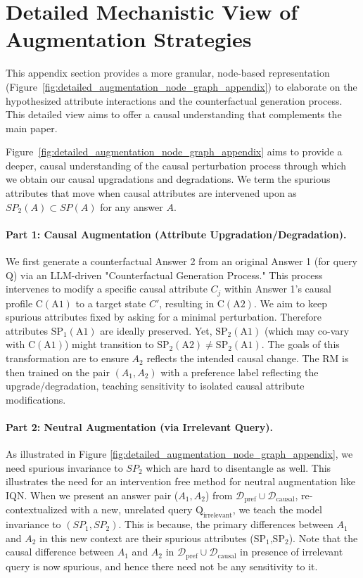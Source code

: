 \section{Detailed Mechanistic View of Augmentation Strategies}
\label{app:detailed_augmentation_diagrams}

This appendix section provides a more granular, node-based representation (Figure~\ref{fig:detailed_augmentation_node_graph_appendix}) to elaborate on the hypothesized attribute interactions and the counterfactual generation process. This detailed view aims to offer a causal understanding that complements the main paper.

Figure~\ref{fig:detailed_augmentation_node_graph_appendix} aims to provide a deeper, causal understanding of the causal perturbation process through which we obtain our causal upgradations and degradations. We term the spurious attributes that move when causal attributes are intervened upon as $SP_2(A) \subset SP(A)$ for any answer $A$.

\paragraph{Part 1: Causal Augmentation (Attribute Upgradation/Degradation).}
We first generate a counterfactual Answer 2 from an original Answer 1 (for query $\mathrm{Q}$) via an LLM-driven "Counterfactual Generation Process." This process intervenes to modify a specific causal attribute $C_j$ within Answer 1's causal profile $\mathrm{C(A1)}$ to a target state $C'$, resulting in $\mathrm{C(A2)}$. 
We aim to keep spurious attributes fixed by asking for a minimal perturbation. Therefore attributes $\mathrm{SP_1(A1)}$ are ideally preserved.
Yet, $\mathrm{SP_2(A1)}$ (which may co-vary with $\mathrm{C(A1)}$) might transition to $\mathrm{SP_2(A2)}\neq\mathrm{SP_2(A1)}$. The goals of this transformation are to ensure $A_2$ reflects the intended causal change. The RM is then trained on the pair $(A_1, A_2)$ with a preference label reflecting the upgrade/degradation, teaching sensitivity to isolated causal attribute modifications. 

\paragraph{Part 2: Neutral Augmentation (via Irrelevant Query).}
As illustrated in Figure \ref{fig:detailed_augmentation_node_graph_appendix}, we need spurious invariance to $SP_2$ which are hard to disentangle as well. This illustrates the need for an intervention free method for neutral augmentation like IQN. When we present an answer pair ($A_1, A_2$) from $\mathcal{D}_{\mathrm{pref}} \cup \mathcal{D}_{\mathrm{causal}}$,
re-contextualized with a new, unrelated query $\mathrm{Q}_{\text{irrelevant}}$,
we teach the model invariance to $(SP_1, SP_2)$.
This is because, the primary differences between $A_1$ and $A_2$ in this new context are their spurious attributes ($\mathrm{SP_1}$,$\mathrm{SP_2}$). 
Note that the causal difference between $A_1$ and $A_2$ in $\mathcal{D}_{\mathrm{pref}} \cup \mathcal{D}_{\mathrm{causal}}$ in presence of irrelevant query is now spurious, and hence there need not be any sensitivity to it.


